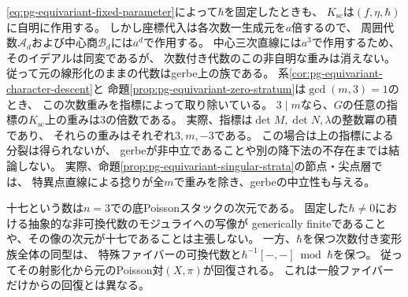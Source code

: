 \begin{remark}[次数重みと十七次元の意味]
\label{rem:pg-equivariant-gerbe-degree-weights}
\eqref{eq:pg-equivariant-fixed-parameter}によって$\hbar$を固定したときも、
$K_{\mathrm{sc}}$は$(f,\eta,\hbar)$に自明に作用する。
しかし座標代入は各次数一生成元を$a$倍するので、
周囲代数$\mathcal A_d$および中心商$\mathcal B_d$には$a^d$で作用する。
中心三次直線には$a^3$で作用するため、そのイデアルは同変であるが、
次数付き代数のこの非自明な重みは消えない。
従って元の線形化のままの代数はgerbe上の族である。
系\ref{cor:pg-equivariant-character-descent}と
命題\ref{prop:pg-equivariant-zero-stratum}は$\gcd(m,3)=1$のとき、
この次数重みを指標によって取り除いている。
$3\mid m$なら、$G$の任意の指標の$K_{\mathrm{sc}}$上の重みは$3$の倍数である。
実際、指標は$\det M,\det N,\lambda$の整数冪の積であり、
それらの重みはそれぞれ$3,m,-3$である。
この場合は上の指標による分裂は得られないが、
gerbeが非中立であることや別の降下法の不存在までは結論しない。
実際、命題\ref{prop:pg-equivariant-singular-strata}の節点・尖点層では、
特異点直線による捻りが全$m$で重みを除き、gerbeの中立性も与える。

十七という数は$n=3$での底Poissonスタックの次元である。
固定した$\hbar\ne0$における抽象的な非可換代数のモジュライへの写像が
generically finiteであることや、その像の次元が十七であることは主張しない。
一方、$\hbar$を保つ次数付き変形族全体の同型は、
特殊ファイバーの可換代数と$\hbar^{-1}[-,-]\bmod\hbar$を保つ。
従ってその射影化から元のPoisson対$(X,\pi)$が回復される。
これは一般ファイバーだけからの回復とは異なる。
\end{remark}
